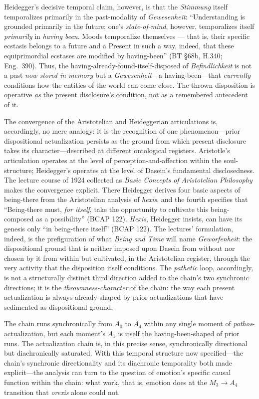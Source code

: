\documentclass{article}
\begin{document}
Heidegger's decisive temporal claim, however, is that the \textit{Stimmung} itself temporalizes primarily in the past-modality of \textit{Gewesenheit}: ``Understanding is grounded primarily in the future; one's \textit{state-of-mind}, however, temporalizes itself \textit{primarily} in \textit{having been}. Moods temporalize themselves --- that is, their specific ecstasis belongs to a future and a Present in such a way, indeed, that these equiprimordial ecstases are modified by having-been'' (BT \S68b, H.340; Eng.~390). Thus, the having-already-found-itself-disposed of \textit{Befindlichkeit} is not a past \textit{now stored in memory} but a \textit{Gewesenheit}---a having-been---that \textit{currently} conditions how the entities of the world can come close. The thrown disposition is operative \textit{as} the present disclosure's condition, not as a remembered antecedent of it.

The convergence of the Aristotelian and Heideggerian articulations is, accordingly, no mere analogy: it is the recognition of one phenomenon---prior dispositional actualization persists as the ground from which present disclosure takes its character---described at different ontological registers. Aristotle's articulation operates at the level of perception-and-affection within the soul-structure; Heidegger's operates at the level of Dasein's fundamental disclosedness. The lecture course of 1924 collected as \textit{Basic Concepts of Aristotelian Philosophy} makes the convergence explicit. There Heidegger derives four basic aspects of being-there from the Aristotelian analysis of \textit{hexis}, and the fourth specifies that ``Being-there must, \textit{for itself}, take the opportunity to cultivate this being-composed as a possibility'' (BCAP 122). \textit{Hexis}, Heidegger insists, can have its genesis only ``in being-there itself'' (BCAP 122). The lectures' formulation, indeed, is the prefiguration of what \textit{Being and Time} will name \textit{Geworfenheit}: the dispositional ground that is neither imposed upon Dasein from without nor chosen by it from within but cultivated, in the Aristotelian register, through the very activity that the disposition itself conditions. The \textit{pathetic} loop, accordingly, is not a structurally distinct third direction added to the chain's two synchronic directions; it is the \textit{thrownness-character} of the chain: the way each present actualization is always already shaped by prior actualizations that have sedimented as dispositional ground.

The chain runs synchronically from $A_0$ to $A_4$ within any single moment of \textit{pathos}-actualization, but each moment's $A_1$ is itself the having-been-shaped of prior runs. The actualization chain is, in this precise sense, synchronically directional but diachronically saturated. With this temporal structure now specified---the chain's synchronic directionality and its diachronic temporality both made explicit---the analysis can turn to the question of emotion's specific causal function within the chain: what work, that is, emotion does at the $M_3 \rightarrow A_4$ transition that \textit{orexis} alone could not.
\end{document}
